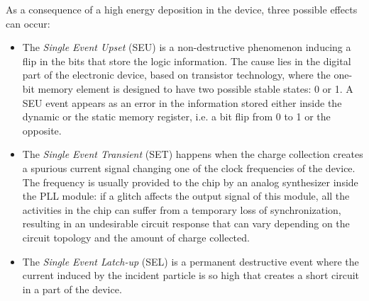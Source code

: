 

As a consequence of a high energy deposition in the device, three possible effects can occur:
\begin{itemize}
    \item The \textit{Single Event Upset} (SEU) is a non-destructive phenomenon inducing a flip in the bits that store the logic information. The cause lies in the digital part of the electronic device, based on transistor technology, where the one-bit memory element is designed to have two possible stable states: 0 or 1. A SEU event appears as an error in the information stored either inside the dynamic or the static memory register, i.e. a bit flip from 0 to 1 or the opposite.
    \item The \textit{Single Event Transient} (SET) happens when the charge collection creates a spurious current signal changing one of the clock frequencies of the device. The frequency is usually provided to the chip by an analog synthesizer inside the PLL module: if a glitch affects the output signal of this module, all the activities in the chip can suffer from a temporary loss of synchronization, resulting in an undesirable circuit response that can vary depending on the circuit topology and the amount of charge collected.
    \item The \textit{Single Event Latch-up} (SEL) is a permanent destructive event where the current induced by the incident particle is so high that creates a short circuit in a part of the device.
\end{itemize}

